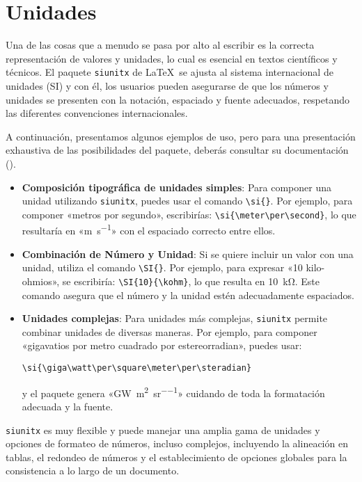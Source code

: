   \section{Unidades}
  
  Una de las cosas que a menudo se pasa por alto al escribir es la correcta representación de valores y unidades, lo cual es esencial en textos científicos y técnicos. El paquete \texttt{siunitx} de \LaTeX\ se ajusta al sistema internacional de unidades (SI) y con él, los usuarios pueden asegurarse de que los números y unidades se presenten con la notación, espaciado y fuente adecuados, respetando las diferentes convenciones internacionales.
  
  A continuación, presentamos algunos ejemplos de uso, pero para una presentación exhaustiva de las posibilidades del paquete, deberás consultar su documentación (\cite{siunitx}).
  
  \begin{itemize}
      \item \textbf{Composición tipográfica de unidades simples}: Para componer una unidad utilizando \texttt{siunitx}, puedes usar el comando \verb|\si{}|. Por ejemplo, para componer «metros por segundo», escribirías: \verb|\si{\meter\per\second}|, lo que resultaría en «\si{\meter\per\second}» con el espaciado correcto entre ellos.
  
      \item \textbf{Combinación de Número y Unidad}: Si se quiere incluir un valor con una unidad, utiliza el comando \verb|\SI{}|. Por ejemplo, para expresar «10 kilo-ohmios», se escribiría: \verb|\SI{10}{\kohm}|, lo que resulta en \SI{10}{\kohm}. Este comando asegura que el número y la unidad estén adecuadamente espaciados.
  
      \item \textbf{Unidades complejas}: Para unidades más complejas, \texttt{siunitx} permite combinar unidades de diversas maneras. Por ejemplo, para componer «gigavatios por metro cuadrado por estereorradian», puedes usar:
      
      \verb|\si{\giga\watt\per\square\meter\per\steradian}|
      
      y el paquete genera «\si{\giga\watt\per\square\meter\per\steradian}» cuidando de toda la formatación adecuada y la fuente.
  
  \end{itemize}
  
  \texttt{siunitx} es muy flexible y puede manejar una amplia gama de unidades y opciones de formateo de números, incluso complejos, incluyendo la alineación en tablas, el redondeo de números y el establecimiento de opciones globales para la consistencia a lo largo de un documento.
  
